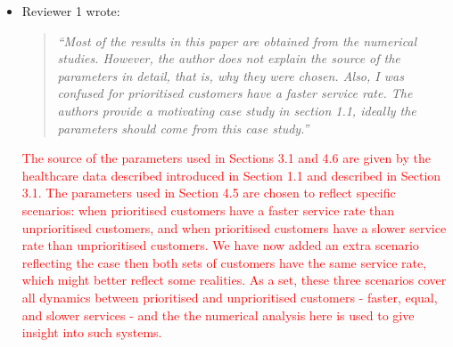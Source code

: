 \documentclass{article}
\begin{document}
\begin{itemize}
\textcolor{red}{Thank you very much for the comments which led us to explore analytical formulae that are now in the paper. We have:
\begin{itemize}
  \item changed the labelling of Equations (1) and (5) so that each case is referencable, then sentences have been added explaining what the transition in each case refers to. We hope this explains these equations more clearly to the readers.
  \item added some further analysis about the Markov chains, explicitly noting that the sojourn time CDF is a general phase-type distribution, and giving the exact equation for the CDF. Commentary on this is also given, explaining that taking a matrix exponential is computationally expensive, and that general phase-type distributions do not have easily found inverses. 
  \item Section 4.3 explicitly analyses the bounded approximation method by developing two accuracy measures, one for the ergodic Markov chain, and another for the absorbing Markov chain. These measures help decide if the value of $b$ chosen is a good one. The numerical results presented in this section demonstrate how these accuracy measures work. Section 4.4 then proves the system's stability under certain conditions, and experimentally determines the system's stability under other conditions.
\end{itemize}
}


\item Reviewer 1 wrote:
\begin{quote}\it
``Most of the results in this paper are obtained from the numerical studies. However, the author does not explain the source of the parameters in detail, that is, why they were chosen. Also, I was confused for prioritised customers have a faster service rate. The authors provide a motivating case study in section 1.1, ideally the parameters should come from this case study.''
\end{quote}

\textcolor{red}{The source of the parameters used in Sections 3.1 and 4.6 are given by the healthcare data described introduced in Section 1.1 and described in Section 3.1. The parameters used in Section 4.5 are chosen to reflect specific scenarios: when prioritised customers have a faster service rate than unprioritised customers, and when prioritised customers have a slower service rate than unprioritised customers. We have now added an extra scenario reflecting the case then both sets of customers have the same service rate, which might better reflect some realities. As a set, these three scenarios cover all dynamics between prioritised and unprioritised customers - faster, equal, and slower services - and the the numerical analysis here is used to give insight into such systems.}


\end{itemize}
\end{document}
